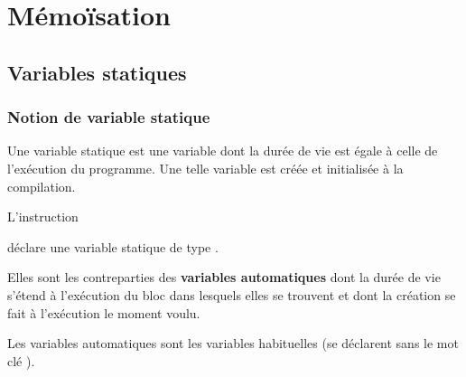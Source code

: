 
\section{Mémoïsation}

\subsection{Variables statiques}

\begin{frame}[fragile]
\frametitle{Notion de variable statique}
Une \alert{variable statique} est une variable dont la durée de vie est
égale à celle de l'exécution du programme. Une telle variable est créée
et initialisée à la compilation.
\medskip

L'instruction
\begin{center}
\end{center}
déclare une variable statique  de type .
\bigskip
\bigskip
\bigskip

Elles sont les contreparties des {\bf variables automatiques} dont la
durée de vie s'étend à l'exécution du bloc dans lesquels elles se trouvent
et dont la création se fait à l'exécution le moment voulu.
\medskip

Les variables automatiques sont les variables habituelles (se déclarent
sans le mot clé ).
\end{frame}

